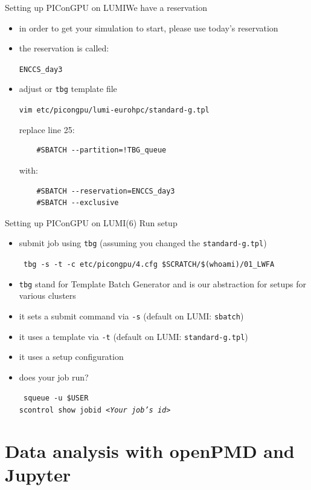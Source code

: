 \documentclass[
  aspectratio=169,
  10pt
]{beamer}
\newcommand{\terminal}[1]{\par\noindent\colorbox{shadecolor}
{\parbox{\dimexpr\textwidth-2\fboxsep\relax}{\texttt{#1}}}}
\begin{document}
\begin{frame}[t,fragile]{Setting up PIConGPU on LUMI}{We have a reservation}
\begin{itemize}
    \item in order to get your simulation to start, please use today's reservation
    \item the reservation is called:
    {\Large
    \begin{center}
        \texttt{ENCCS\_day3}
    \end{center}
    }
    \item adjust or \texttt{tbg} template file
    \terminal{vim etc/picongpu/lumi-eurohpc/standard-g.tpl}
    replace line 25: \\
    \begin{verbatim}
    #SBATCH --partition=!TBG_queue
    \end{verbatim}
    with:
    \begin{verbatim}    
    #SBATCH --reservation=ENCCS_day3
    #SBATCH --exclusive
    \end{verbatim}    
\end{itemize}
\end{frame}


\begin{frame}[t,fragile]{Setting up PIConGPU on LUMI}{(6) Run setup}
\begin{itemize}
    \item submit job using \texttt{tbg} (assuming you changed the \texttt{standard-g.tpl})
    \terminal{%
        tbg -s -t -c etc/picongpu/4.cfg \$SCRATCH/\$(whoami)/01\_LWFA
    }
    \item \texttt{tbg} stand for Template Batch Generator and is our abstraction for setups for various clusters
    \item it sets a submit command via \texttt{-s} (default on LUMI: \texttt{sbatch})
    \item it uses a template via \texttt{-t} (default on LUMI: \texttt{standard-g.tpl})
    \item it uses a setup configuration 
    \item does your job run?
        \terminal{%
            squeue -u \$USER\\
            scontrol show jobid \textit{<Your job's id>}
        }
\end{itemize}
\end{frame}

\part{Data analysis with openPMD and Jupyter}
\frame{\partpage}
\end{document}
